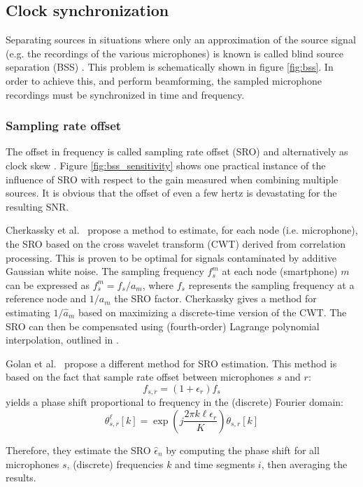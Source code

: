 \subsection{Clock synchronization}
\label{subsec:synch}
Separating sources in situations where only an approximation of the source signal (e.g. the recordings of the various microphones) is known is called blind source separation (BSS) \cite{wehr2004}. This problem is schematically shown in figure \ref{fig:bss}. In order to achieve this, and perform beamforming, the sampled microphone recordings must be synchronized in time and frequency.

\subsubsection{Sampling rate offset}
The offset in frequency is called sampling rate offset (SRO) \cite{wehr2004} and alternatively as clock skew \cite{Schmalenstroeer2015}. Figure \ref{fig:bss_sensitivity} shows one practical instance of the influence of SRO with respect to the gain measured when combining multiple sources. It is obvious that the offset of even a few hertz is devastating for the resulting SNR.

Cherkassky et al.\ \cite{cherkassky2014blind} propose a method to estimate, for each node (i.e. microphone), the SRO based on the cross wavelet transform (CWT) derived from correlation processing. This is proven to be optimal for signals contaminated by additive Gaussian white noise. The sampling frequency $f_s^m$ at each node (smartphone) $m$ can be expressed as $f_s^m=f_s/a_m$, where $f_s$ represents the sampling frequency at a reference node and $1/a_m$ the SRO factor. Cherkassky gives a method for estimating $1/\hat{a}_m$ based on maximizing a discrete-time version of the CWT. The SRO can then be compensated using (fourth-order) Lagrange polynomial interpolation, outlined in \cite{golan2012}.

Golan et al.\ \cite{golan2012} propose a different method for SRO estimation. This method is based on the fact that sample rate offset between microphones $s$ and $r$:
\[
f_{s,r} = (1 + \epsilon_{r}) f_{s}
\]
yields a phase shift proportional to frequency in the (discrete) Fourier domain:
\[
\theta_{s,r}^{\ell}[k] = \exp\left(j \frac{2 \pi k \ell \epsilon_{r}}{K}\right) \theta_{s,r}[k]
\]

Therefore, they estimate the SRO $\hat{\epsilon}_{n}$ by computing the phase shift for all microphones $s$, (discrete) frequencies $k$ and time segments $i$, then averaging the results.


